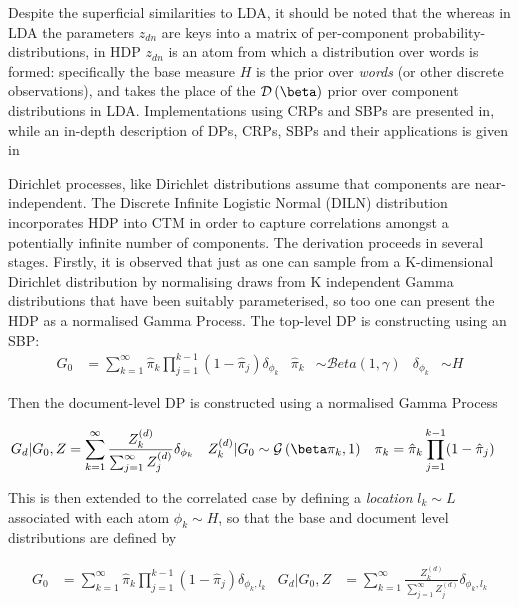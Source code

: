 Despite the superficial similarities to LDA, it should be noted that the whereas in LDA the parameters $z_{dn}$ are keys into a matrix of per-component probability-distributions, in HDP $z_{dn}$ is an atom from which a distribution over words is formed: specifically the base measure $H$ is the prior over \emph{words} (or other discrete observations), and takes the place of the $\dir{\vv{\beta}}$ prior over component distributions in LDA. Implementations using CRPs and SBPs are presented in\cite{Teh2006b}, while an in-depth description of DPs, CRPs, SBPs and their applications is given in\cite{JordanMichael2005a}

Dirichlet processes, like Dirichlet distributions assume that components are near-independent. The Discrete Infinite Logistic Normal (DILN) distribution\cite{Paisley2012} incorporates HDP into CTM in order to capture correlations amongst a potentially infinite number of components. The derivation proceeds in several stages. Firstly, it is observed that just as one can sample from a K-dimensional Dirichlet distribution by normalising draws from K independent Gamma distributions that have been suitably parameterised, so too one can present the HDP as a normalised Gamma Process. The top-level DP is constructing using an SBP:
\begin{align}
G_0 & = \sum_{k=1}^\infty \hat{\pi}_k \prod_{j=1}^{k-1} (1 - \hat{\pi}_j)\delta_{\phi_k} & 
\hat{\pi}_k & \sim \mathcal{B}eta\left(1, \gamma\right) &
\delta_{\phi_k} & \sim H
\end{align}

Then the document-level DP is constructed using a normalised Gamma Process

\begin{align}
G_d|G_0, Z & = \sum_{k=1}^\infty \frac{Z_k^{(d)}}{\sum_{j=1}^\infty Z_j^{(d)}} \delta_{\phi_k} &
Z_k^{(d)} | G_0 &\sim \gam{\beta \pi_k}{1} &
\pi_k & = \hat{\pi}_k \prod_{j=1}^{k-1} (1 - \hat{\pi}_j)
\end{align}

This is then extended to the correlated case by defining a \emph{location} $l_k \sim L$ associated with each atom $\phi_k \sim H$, so that the base and document level distributions are defined by

\begin{align}
G_0 & = \sum_{k=1}^\infty \hat{\pi}_k \prod_{j=1}^{k-1} (1 - \hat{\pi}_j)\delta_{\phi_k,l_k} &
G_d|G_0, Z & = \sum_{k=1}^\infty \frac{Z_k^{(d)}}{\sum_{j=1}^\infty Z_j^{(d)}} \delta_{\phi_k, l_k}
\end{align}

